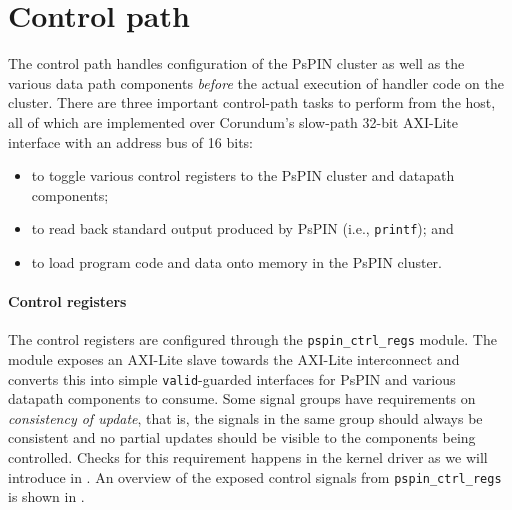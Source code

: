 \section{Control path}

The control path handles configuration of the PsPIN cluster as well as the various data path components \emph{before} the actual execution of handler code on the cluster.  There are three important control-path tasks to perform from the host, all of which are implemented over Corundum's slow-path 32-bit AXI-Lite interface with an address bus of 16 bits:

\begin{itemize}
    \item to toggle various control registers to the PsPIN cluster and datapath components;
    \item to read back standard output produced by PsPIN (i.e., \texttt{printf}); and
    \item to load program code and data onto memory in the PsPIN cluster.
\end{itemize}

\paragraph{Control registers} The control registers are configured through the \texttt{pspin\_ctrl\_regs} module.  The module exposes an AXI-Lite slave towards the AXI-Lite interconnect and converts this into simple \texttt{valid}-guarded interfaces for PsPIN and various datapath components to consume.  Some signal groups have requirements on \emph{consistency of update}, that is, the signals in the same group should always be consistent and no partial updates should be visible to the components being controlled.  Checks for this requirement happens in the kernel driver as we will introduce in .  An overview of the exposed control signals from \texttt{pspin\_ctrl\_regs} is shown in .

